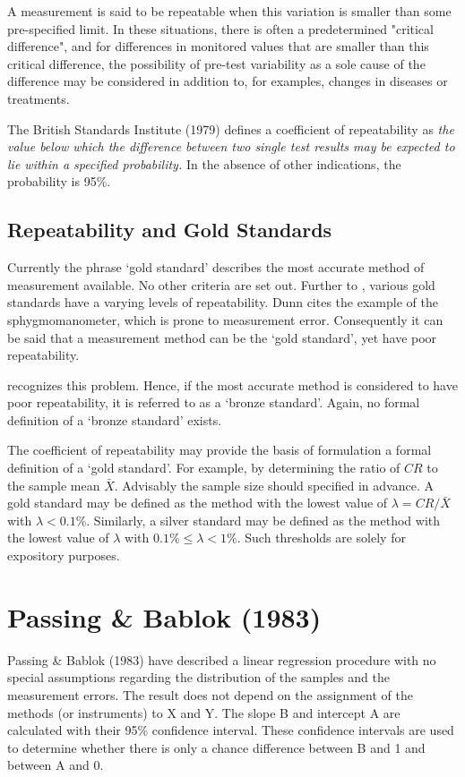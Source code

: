 \documentclass[MAIN.tex]{subfiles}
\begin{document}

A measurement is said to be repeatable when this variation is smaller than some pre-specified limit. In these situations, there is often a predetermined "critical difference", and for differences in monitored values that are smaller than this critical difference, the possibility of pre-test variability as a sole cause of the difference may be considered in addition to, for examples, changes in diseases or treatments. 


The British Standards Institute (1979) defines a coefficient of repeatability  as \emph{the value below which the difference between two single test results may be expected to lie within a specified probability.} In the absence of other indications, the probability is 95\%.

\subsection{Repeatability and Gold Standards}
Currently the phrase `gold standard' describes the most accurate method of measurement available. No other criteria are set out. Further to \citet{dunnSEME}, various gold standards have a varying levels of repeatability. Dunn cites the example of the sphygmomanometer, which is prone to measurement error. Consequently it can be said that a measurement method can be the `gold standard', yet have poor repeatability. 

\citet{dunnSEME} recognizes this problem. Hence, if the most accurate method is considered to have poor repeatability, it is referred to as a `bronze standard'.  Again, no formal definition of a `bronze standard' exists.

The coefficient of repeatability may provide the basis of formulation a formal definition of a `gold standard'. For example, by determining the ratio of $CR$ to the sample mean $\bar{X}$. Advisably the sample size should specified in advance. A gold standard may be defined as the method with the lowest value of $\lambda = CR /\bar{X}$ with $\lambda < 0.1\%$. Similarly, a silver standard may be defined as the method with the lowest value of $\lambda $ with $0.1\% \leq \lambda < 1\%$. Such thresholds are solely for expository purposes.
\section*{Passing \& Bablok (1983)}
Passing \& Bablok (1983) have described a linear regression procedure with no special assumptions regarding the distribution of the samples and the measurement errors. The result does not depend on the assignment of the methods (or instruments) to X and Y. The slope B and intercept A are calculated with their 95\% confidence interval. These confidence intervals are used to determine whether there is only a chance difference between B and 1 and between A and 0.
\end{document}

